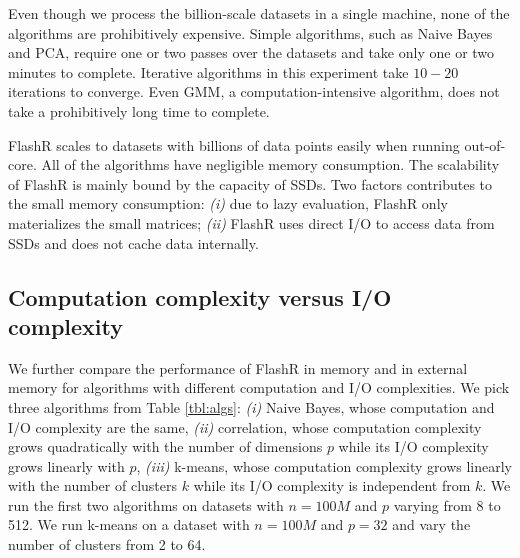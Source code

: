 Even though we process the billion-scale datasets in a single machine, none of
the algorithms are prohibitively expensive. Simple algorithms, such as
Naive Bayes and PCA, require one or two passes over the datasets and take
only one or two minutes to complete. Iterative algorithms in this experiment
take $10-20$ iterations to converge.
Even GMM, a computation-intensive algorithm, does not take
a prohibitively long time to complete.

FlashR scales to datasets with billions of data points easily when running
out-of-core. All of the algorithms have negligible memory consumption.
The scalability of FlashR is mainly bound by the capacity of SSDs.
Two factors contributes to the small memory consumption: \textit{(i)}
due to lazy evaluation, FlashR only materializes the small matrices;
\textit{(ii)} FlashR uses direct I/O to access data from SSDs and
does not cache data internally.

\subsection{Computation complexity versus I/O complexity}
We further compare the performance of FlashR in memory and in external memory
for algorithms with different computation and I/O complexities.
We pick three algorithms from Table \ref{tbl:algs}: \textit{(i)} Naive Bayes,
whose computation and I/O complexity are the same, \textit{(ii)}
correlation, whose computation complexity grows quadratically with the number
of dimensions $p$ while
its I/O complexity grows linearly with $p$, \textit{(iii)} k-means, whose computation
complexity grows linearly with the number of clusters $k$ while its I/O
complexity is independent
from $k$. We run the first two algorithms on datasets with $n=100M$ and $p$
varying from 8 to 512. We run k-means on a dataset with $n=100M$ and $p=32$
and vary the number of clusters from 2 to 64.

